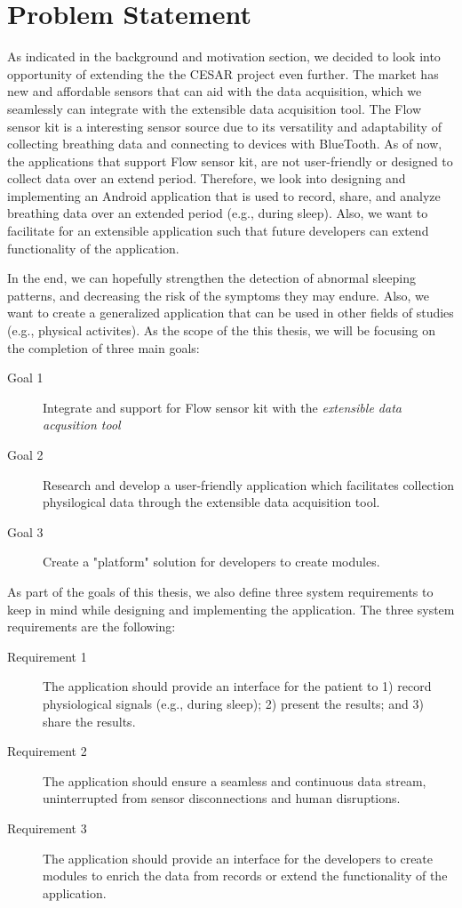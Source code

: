 \section{Problem Statement}

As indicated in the background and motivation section, we decided to look into opportunity of extending the the CESAR project even further. The market has new and affordable sensors that can aid with the data acquisition, which we seamlessly can integrate with the extensible data acquisition tool. The Flow sensor kit is a interesting sensor source due to its versatility and adaptability of collecting breathing data and connecting to devices with BlueTooth. As of now, the applications that support Flow sensor kit, are not user-friendly or designed to collect data over an extend period. Therefore, we look into designing and implementing an Android application that is used to record, share, and analyze breathing data over an extended period (e.g., during sleep). Also, we want to facilitate for an extensible application such that future developers can extend functionality of the application. 

In the end, we can hopefully strengthen the detection of abnormal sleeping patterns, and decreasing the risk of the symptoms they may endure. Also, we want to create a generalized application that can be used in other fields of studies (e.g., physical activites). As the scope of the this thesis, we will be focusing on the completion of three main goals:

\begin{description}
    \item[Goal 1] Integrate and support for Flow sensor kit with the \textit{extensible data acqusition tool}
    \item[Goal 2] Research and develop a user-friendly application which facilitates collection physilogical data through the extensible data acquisition tool.
    \item[Goal 3] Create a "platform" solution for developers to create modules. 
\end{description}

As part of the goals of this thesis, we also define three system requirements to keep in mind while designing and implementing the application. The three system requirements are the following: 

\begin{description}
    \item[Requirement 1] The application should provide an interface for the patient to 1) record physiological signals (e.g., during sleep); 2) present the results; and 3) share the results.
    \item[Requirement 2] The application should ensure a seamless and continuous data stream, uninterrupted from sensor disconnections and human disruptions.
    \item[Requirement 3] The application should provide an interface for the developers to create modules to enrich the data from records or extend the functionality of the application.
\end{description}

